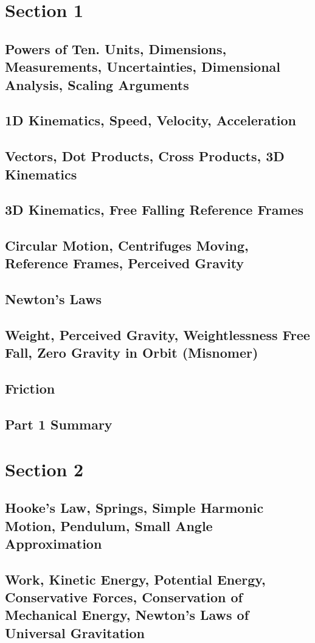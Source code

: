 \documentclass[../introphysics.tex]{subfiles}
\begin{document}
\chapter{Section 1}
\section{Powers of Ten. Units, Dimensions, Measurements, Uncertainties, Dimensional Analysis, Scaling Arguments}
\section{1D Kinematics, Speed, Velocity, Acceleration}
\section{Vectors, Dot Products, Cross Products, 3D Kinematics}
\section{3D Kinematics, Free Falling Reference Frames}
\section{Circular Motion, Centrifuges Moving, Reference Frames, Perceived Gravity}
\section{Newton's Laws}
\section{Weight, Perceived Gravity, Weightlessness Free Fall, Zero Gravity in Orbit (Misnomer)}
\section{Friction}
\section{Part 1 Summary}
\chapter{Section 2}
\section{Hooke's Law, Springs, Simple Harmonic Motion, Pendulum, Small Angle Approximation}
\section{Work, Kinetic Energy, Potential Energy, Conservative Forces, Conservation of Mechanical Energy, Newton's Laws of Universal Gravitation}
\end{document}
